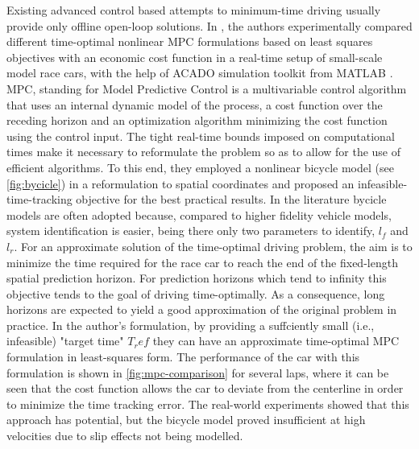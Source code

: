 Existing advanced control based attempts to minimum-time driving usually provide only offline open-loop solutions.
In \cite{mpc}, the authors experimentally compared different time-optimal nonlinear MPC \cite{mpc_orig} formulations based on least squares objectives with an economic cost function in a real-time setup of small-scale model race cars, with the help of ACADO simulation toolkit from MATLAB \cite{acado}.
MPC, standing for Model Predictive Control is a multivariable control algorithm that uses an internal dynamic model of the process, a cost function over the receding horizon and an optimization algorithm minimizing the cost function using the control input.
The tight real-time bounds imposed on computational times make it necessary to reformulate the problem so as to allow for the use of efficient algorithms. To this end, they employed a nonlinear bicycle model \cite{bycicle} (see \ref{fig:bycicle}) in a reformulation to spatial coordinates and proposed an infeasible-time-tracking objective for the best practical results. In the literature bycicle models are often adopted because, compared to higher fidelity vehicle models, system identification is easier, being there only two parameters to identify, $l_f$ and $l_r$.
For an approximate solution of the time-optimal driving problem, the aim is to minimize the time required for the race car to reach the end of the fixed-length spatial prediction horizon. For prediction horizons which tend to infinity this objective tends to the goal of driving time-optimally. As a consequence, long horizons are expected to yield a good approximation of the original problem in practice.
In the author's formulation, by providing a suffciently small (i.e., infeasible) "target time" \(T_ref\) they can have an approximate time-optimal MPC formulation in least-squares form. The performance of the car with this formulation is shown in \ref{fig:mpc-comparison} for several laps, where it can be seen that the cost
function allows the car to deviate from the centerline in order to minimize the time tracking error.
The real-world experiments showed that this approach has potential, but the bicycle model proved insufficient at high velocities due to slip effects not being modelled.
